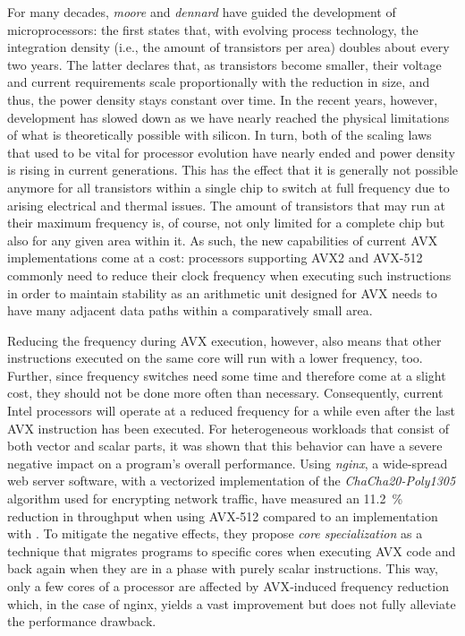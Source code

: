 {For many decades, \emph{\gls{moore}} and \emph{\gls{dennard}} have guided the development of microprocessors: the first states that, with evolving process technology, the integration density (i.e., the amount of transistors per area) doubles about every two years. The latter declares that, as transistors become smaller, their voltage and current requirements scale proportionally with the reduction in size, and thus, the power density stays constant over time. In the recent years, however, development has slowed down as we have nearly reached the physical limitations of what is theoretically possible with silicon. In turn, both of the scaling laws that used to be vital for processor evolution have nearly ended and power density is rising in current generations. This has the effect that it is generally not possible anymore for all transistors within a single chip to switch at full frequency due to arising electrical and thermal issues. The amount of transistors that may run at their maximum frequency is, of course, not only limited for a complete chip but also for any given area within it. As such, the new capabilities of current \gls{AVX} implementations come at a cost: processors supporting \gls{AVX2} and \gls{AVX-512} commonly need to reduce their clock frequency when executing such instructions in order to maintain stability as an arithmetic unit designed for \gls{AVX} needs to have many adjacent data paths within a comparatively small area.

Reducing the frequency during \gls{AVX} execution, however, also means that other instructions executed on the same core will run with a lower frequency, too. Further, since frequency switches need some time and therefore come at a slight cost, they should not be done more often than necessary. Consequently, current Intel processors will operate at a reduced frequency for a while even after the last \gls{AVX} instruction has been executed. For heterogeneous workloads that consist of both vector and scalar parts, it was shown that this behavior can have a severe negative impact on a program's overall performance. Using \emph{nginx}, a wide-spread web server software, with a vectorized implementation of the \textit{ChaCha20-Poly1305} algorithm used for encrypting network traffic, \citeauthor{gottschlag19sfma} \cite{gottschlag19sfma} have measured an \SI{11.2}{\percent} reduction in throughput when using \gls{AVX-512} compared to an implementation with . To mitigate the negative effects, they propose \emph{core specialization} as a technique that migrates programs to specific cores when executing \gls{AVX} code and back again when they are in a phase with purely scalar instructions. This way, only a few cores of a processor are affected by \gls{AVX}-induced frequency reduction which, in the case of nginx, yields a vast improvement but does not fully alleviate the performance drawback.

}
